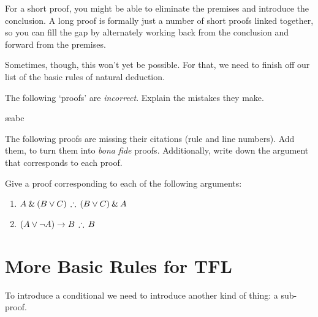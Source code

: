 For a short proof, you might be able to eliminate the premises and introduce the conclusion. A long proof is formally just a number of short proofs linked together, so you can fill the gap by alternately working back from the conclusion and forward from the premises.

Sometimes, though, this won't yet be possible. For that, we need to finish off our list of the basic rules of natural deduction. 



\practiceproblems

\problempart
The following  `proofs' are \emph{incorrect}. Explain the mistakes they make.

\begin{pf}
\ae{abc}
\end{pf}

\problempart
The following proofs are missing their citations (rule and line numbers). Add them, to turn them into \emph{bona fide} proofs. Additionally, write down the argument that corresponds to each proof.

\begin{pf}
\end{pf}

\solutions
\problempart
\label{pr.solvedTFLproofs}
Give a proof corresponding to each of the following arguments:
\begin{enumerate}
\item $A\eand (B\eor C)\,\therefore\,(B\eor C)\eand A$
\item $(A\eor\enot A)\eif B\,\therefore\, B$
\end{enumerate}




\chapter{More Basic Rules for TFL}

To introduce a conditional we need to introduce another kind of thing: a sub-proof. 

